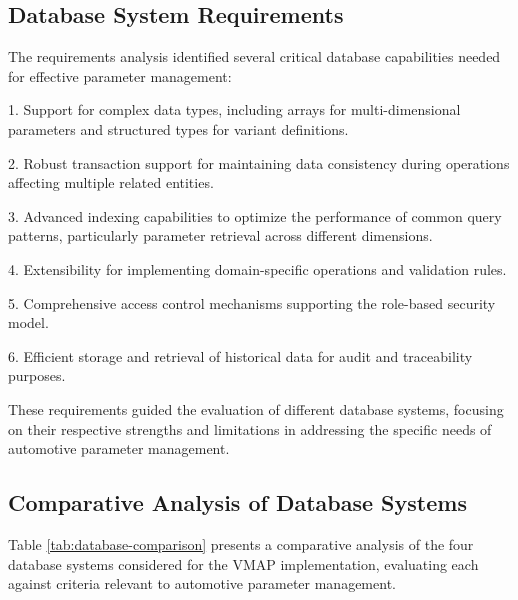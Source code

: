 \subsection{Database System Requirements}
\label{subsec:database-requirements}

The requirements analysis identified several critical database capabilities needed for effective parameter management:

1. Support for complex data types, including arrays for multi-dimensional parameters and structured types for variant definitions.

2. Robust transaction support for maintaining data consistency during operations affecting multiple related entities.

3. Advanced indexing capabilities to optimize the performance of common query patterns, particularly parameter retrieval across different dimensions.

4. Extensibility for implementing domain-specific operations and validation rules.

5. Comprehensive access control mechanisms supporting the role-based security model.

6. Efficient storage and retrieval of historical data for audit and traceability purposes.

These requirements guided the evaluation of different database systems, focusing on their respective strengths and limitations in addressing the specific needs of automotive parameter management.

\subsection{Comparative Analysis of Database Systems}
\label{subsec:database-comparison}

Table \ref{tab:database-comparison} presents a comparative analysis of the four database systems considered for the VMAP implementation, evaluating each against criteria relevant to automotive parameter management.

